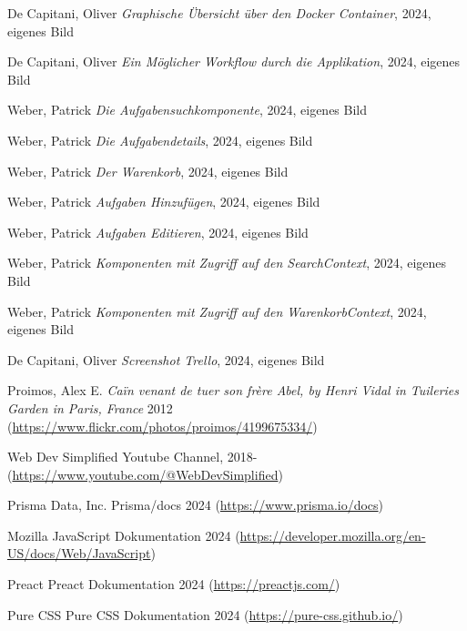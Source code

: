 \documentclass[12pt,a4paper]{scrartcl} %
\begin{document}
\renewcommand{\refname}{Quellenverzeichnis}

\begin{thebibliography}{11} 

 De Capitani, Oliver {\em Graphische Übersicht über den Docker Container}, 2024, eigenes Bild

 De Capitani, Oliver {\em Ein Möglicher Workflow durch die Applikation}, 2024, eigenes Bild

 Weber, Patrick {\em Die Aufgabensuchkomponente}, 2024, eigenes Bild

 Weber, Patrick {\em Die Aufgabendetails}, 2024, eigenes Bild

 Weber, Patrick {\em Der Warenkorb}, 2024, eigenes Bild

 Weber, Patrick {\em Aufgaben Hinzufügen}, 2024, eigenes Bild

 Weber, Patrick {\em Aufgaben Editieren}, 2024, eigenes Bild

 Weber, Patrick {\em Komponenten mit Zugriff auf den SearchContext}, 2024, eigenes Bild

 Weber, Patrick {\em Komponenten mit Zugriff auf den WarenkorbContext}, 2024, eigenes Bild

 De Capitani, Oliver {\em Screenshot Trello}, 2024, eigenes Bild

 Proimos, Alex E. {\em Caïn venant de tuer son frère Abel, by Henri Vidal in Tuileries Garden in Paris, France} 2012 (\url{https://www.flickr.com/photos/proimos/4199675334/})

 {Web Dev Simplified} Youtube Channel, 2018- (\url{https://www.youtube.com/@WebDevSimplified})

 Prisma Data, Inc. {Prisma/docs} 2024 (\url{https://www.prisma.io/docs})

 Mozilla {JavaScript Dokumentation} 2024 (\url{https://developer.mozilla.org/en-US/docs/Web/JavaScript})

 Preact {Preact Dokumentation} 2024 (\url{https://preactjs.com/})

 Pure CSS {Pure CSS Dokumentation} 2024 (\url{https://pure-css.github.io/})

\end{thebibliography}
\end{document}
